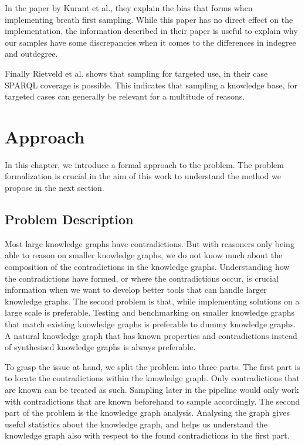\documentclass[11pt,letterpaper ,oneside ]{book}
\begin{document}
	In the paper by Kurant et al.\cite{Kurant:2011}, they explain the bias that forms when implementing breath first sampling.
	While this paper has no direct effect on the implementation, the information described in their paper is useful to explain why our samples have some discrepancies when it comes to the differences in indegree and outdegree. 
	
	Finally Rietveld et al.\cite{Rietveld:2014} shows that sampling for targeted use, in their case SPARQL coverage is possible. This indicates that sampling a knowledge base, for targeted cases can generally be relevant for a multitude of reasons.
	
	
	\newpage
	\chapter{Approach}\label{ProblemDefintion}
	In this chapter, we introduce a formal approach to the problem. The problem formalization is crucial in the aim of this work to understand the method we propose in the next section.
	
	\section{Problem Description}
	Most large knowledge graphs have contradictions. But with reasoners only being able to reason on smaller knowledge graphs, we do not know much about the composition of the contradictions in the knowledge graphs. Understanding how the contradictions have formed, or where the contradictions occur, is crucial information when we want to develop better tools that can handle larger knowledge graphs. The second problem is that, while implementing solutions on a large scale is preferable. Testing and benchmarking on smaller knowledge graphs that match existing knowledge graphs is preferable to dummy knowledge graphs. A natural knowledge graph that has known properties and contradictions instead of synthesised knowledge graphs is always preferable. 
	
	To grasp the issue at hand, we split the problem into three parts. The first part is to locate the contradictions within the knowledge graph. Only contradictions that are known can be treated as such. Sampling later in the pipeline would only work with contradictions that are known beforehand to sample accordingly.
	The second part of the problem is the knowledge graph analysis. Analysing the graph gives useful statistics about the knowledge graph, and helps us understand the knowledge graph also with respect to the found contradictions in the first part.
	
\end{document}
